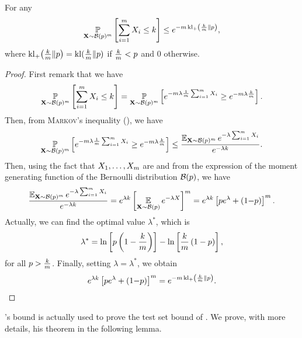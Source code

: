 \begin{noaddcontents}
\begin{lemma}\label{ap:pac-bayes:lemma:chenoff}
For any 
\begin{align*}
    \operatorname*{\mathbb{P}}_{\mathbf{X}\sim\mathcal{B}(p)^m}\left[ \sum_{i=1}^{m}X_i \le k \right] \le e^{-m\operatorname{kl}_{+}\left(\frac{k}{m}\|p\right)},
\end{align*}
where $\operatorname{kl}_{+}\!\left(\frac{k}{m}\|p\right)=\operatorname{kl}(\frac{k}{m}\|p)$ if $\frac{k}{m} < p$ and $0$ otherwise.
\end{lemma}
\begin{proof}
First remark that we have
\begin{align*}
    \operatorname*{\mathbb{P}}_{\mathbf{X}\sim\mathcal{B}(p)^m}\left[ \sum_{i=1}^{m}X_i \le k \right] = \operatorname*{\mathbb{P}}_{\mathbf{X} \sim\mathcal{B}(p)^m}\left[ e^{-m\lambda\frac{1}{m}\sum_{i=1}^{m}X_i}\ge e^{-m\lambda\frac{k}{m}}\right].
\end{align*}
Then, from \textsc{Markov}'s inequality (), we have
\begin{align*}
    \operatorname*{\mathbb{P}}_{\mathbf{X} \sim\mathcal{B}(p)^m}\left[ e^{-m\lambda\frac{1}{m}\sum_{i=1}^{m}X_i}\ge e^{-m\lambda\frac{k}{m}}\right] \le \frac{\operatorname*{\mathbb{E}}_{\mathbf{X} \sim\mathcal{B}(p)^m} e^{-\lambda \sum_{i=1}^{m} X_i}}{e^{-\lambda k}}.
\end{align*}
Then, using the fact that $X_1,\dots,X_m$ are \iid and from the expression of the moment generating function of the Bernoulli distribution $\mathcal{B}(p)$, we have
\begin{align*}
    \frac{\operatorname*{\mathbb{E}}_{\mathbf{X} \sim\mathcal{B}(p)^m} e^{-\lambda \sum_{i=1}^{m} X_i}}{e^{-\lambda k}} = e^{\lambda k}\left[\operatorname*{\mathbb{E}}_{\mathbf{X} \sim\mathcal{B}(p)} e^{-\lambda X}\right]^m = e^{\lambda k}\left[ pe^{\lambda} + (1{-}p)\right]^m.
\end{align*}
Actually, we can find the optimal value $\lambda^*$, which is 
\begin{align*}
    \lambda^* = \ln\left[ p\left( 1-\frac{k}{m}\right)\right] - \ln\left[ \frac{k}{m}\left( 1-p\right) \right],
\end{align*}
for all $p>\frac{k}{m}$.
Finally, setting $\lambda=\lambda^*$, we obtain
\begin{align*}
    e^{\lambda k}\left[ pe^{\lambda} + (1{-}p)\right]^m = e^{-m\operatorname{kl}_{+}\left(\frac{k}{m}\|p\right)}.
\end{align*}
\end{proof}

\citeauthor{Chernoff1952}'s bound is actually used to prove the test set bound of \citet[Theorem~3.3~and~Corollary~3.7]{Langford2005}.
We prove, with more details, his theorem in the following lemma.


\end{noaddcontents}
